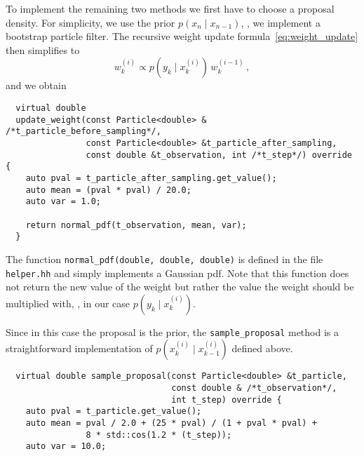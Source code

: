 \begin{example}
  To implement the remaining two methods we first have to choose a
  proposal density. For simplicity, we use the prior
  $p(x_n \mid x_{n-1})$, \ie, we implement a bootstrap particle
  filter.  The recursive weight update
  formula~\eqref{eq:weight_update} then simplifies to
  \[
    w_k^{(i)} \propto p(y_k \mid x_k^{(i)})\, w^{(i-1)}_k \,,
  \]
  and we obtain
\begin{verbatim}
  virtual double
  update_weight(const Particle<double> & /*t_particle_before_sampling*/,
                const Particle<double> &t_particle_after_sampling,
                const double &t_observation, int /*t_step*/) override {
    auto pval = t_particle_after_sampling.get_value();
    auto mean = (pval * pval) / 20.0;
    auto var = 1.0;

    return normal_pdf(t_observation, mean, var);
  }
\end{verbatim}
  The function \texttt{normal\_pdf(double, double, double)} is defined
  in the file \texttt{helper.hh} and simply implements a Gaussian pdf.
  Note that this function does not return the new value of the weight
  but rather the value the weight should be multiplied with, \ie, in
  our case $p(y_k \mid x_k^{(i)})$.

  Since in this case the proposal is the prior, the
  \texttt{sample\_proposal} method is a straightforward implementation
  of $p(x_k^{(i)} \mid x_{k-1}^{(i)})$ defined above.
\begin{verbatim}
  virtual double sample_proposal(const Particle<double> &t_particle,
                                 const double & /*t_observation*/,
                                 int t_step) override {
    auto pval = t_particle.get_value();
    auto mean = pval / 2.0 + (25 * pval) / (1 + pval * pval) +
                8 * std::cos(1.2 * (t_step));
    auto var = 10.0;


\end{verbatim}
\end{example}
